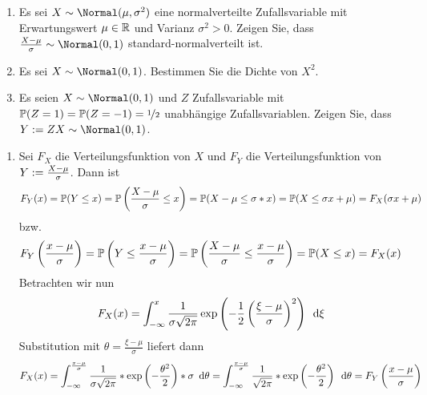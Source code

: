 \begin{exercisePage}[Normalverteilung]
	
	\begin{homework}
		\begin{enumerate}[leftmargin=*, nolistsep]
			\item Es sei $X \sim \Normal(\mu, \sigma^2)$ eine normalverteilte Zufallsvariable mit Erwartungswert $\mu \in \R$ und Varianz $\sigma^2 > 0$. Zeigen Sie, dass $\frac{X- \mu}{\sigma} \sim \Normal(0,1)$ standard-normalverteilt ist.
			\item Es sei $X \sim \Normal(0,1)$. Bestimmen Sie die Dichte von $X^2$.
			\item Es seien $X \sim \Normal(0,1)$ und $Z$ Zufallsvariable mit $\P(Z = 1) = \P(Z = -1) = \lfrac{1}{2}$ unabhängige Zufallsvariablen. Zeigen Sie, dass $Y \defeq ZX \sim \Normal(0,1)$.
		\end{enumerate}
	\end{homework}
	\begin{enumerate}[label=(zu \alph*), leftmargin=*]
		\item Sei $F_X$ die Verteilungsfunktion von $X$ und $F_Y$ die Verteilungsfunktion von $Y \defeq \frac{X - \mu}{\sigma}$. Dann ist
		\begin{equation*}
			F_Y(x) = \P(Y \le x) = \P \left( \frac{X-\mu}{\sigma} \le x \right) = \P(X-\mu \le \sigma * x) = \P(X \le \sigma x + \mu) = F_X (\sigma x + \mu)
		\end{equation*}
		bzw.
		\begin{equation*}
			F_Y \left( \frac{x - \mu}{\sigma} \right) = \P \left( Y \le \frac{x - \mu}{\sigma} \right) = \P \left( \frac{X - \mu}{\sigma} \le \frac{x - \mu}{\sigma} \right) = \P( X \le x) = F_X(x)
		\end{equation*}
		Betrachten wir nun 
		\begin{equation*}
			\begin{aligned}
			F_X(x) = \int_{- \infty}^x \frac{1}{\sigma \sqrt{2\pi}} \exp\left( -\frac{1}{2} \left( \frac{\xi - \mu}{\sigma} \right)^2 \right) \diff{\xi}
			\end{aligned}
		\end{equation*}
		Substitution mit $\theta = \frac{\xi-\mu}{\sigma}$ liefert dann
		\begin{equation*}
			F_X(x) = \int_{- \infty}^{\frac{x-\mu}{\sigma}} \frac{1}{\sigma \sqrt{2\pi}} * \exp\left( -\frac{\theta^2}{2} \right) * \sigma \diff{\theta} = \int_{- \infty}^{\frac{x-\mu}{\sigma}} \frac{1}{\sqrt{2\pi}} * \exp\left( -\frac{\theta^2}{2} \right)  \diff{\theta} =	F_Y \left( \frac{x - \mu}{\sigma} \right)

\end{equation*}
\end{enumerate}
\end{exercisePage}

